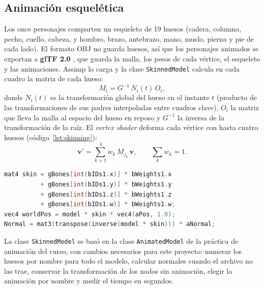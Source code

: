 \documentclass[12pt,letterpaper]{article}
\begin{document}
\subsection{Animación esquelética}
\label{sec:esqueleto}
Los once personajes comparten un esqueleto de 19 huesos (cadera, columna, pecho, cuello,
cabeza, y hombro, brazo, antebrazo, mano, muslo, pierna y pie de cada lado). El formato OBJ
no guarda huesos, así que los personajes animados se exportan a \textbf{glTF 2.0}
\cite{gltf2021}, que guarda la malla, los pesos de cada vértice, el esqueleto y las
animaciones. Assimp \cite{assimp} lo carga y la clase \texttt{SkinnedModel} calcula en cada
cuadro la matriz de cada hueso:
\begin{equation}
  M_i = G^{-1}\, N_i(t)\, O_i,
\end{equation}
donde $N_i(t)$ es la transformación global del hueso en el instante $t$ (producto de las
transformaciones de sus padres interpoladas entre cuadros clave), $O_i$ la matriz que lleva
la malla al espacio del hueso en reposo y $G^{-1}$ la inversa de la transformación de la
raíz. El \emph{vertex shader} deforma cada vértice con hasta cuatro huesos
(código~\ref{lst:skinning}):
\begin{equation}
  \mathbf{v}' = \sum_{k=1}^{4} w_k\, M_{j_k}\, \mathbf{v}, \qquad \sum_k w_k = 1.
\end{equation}

\begin{lstlisting}[language=C, caption={Deformación de vértices con los huesos (\texttt{shaders/phong\_skinning.vs}).}, label={lst:skinning}]
mat4 skin = gBones[int(bIDs1.x)] * bWeights1.x
          + gBones[int(bIDs1.y)] * bWeights1.y
          + gBones[int(bIDs1.z)] * bWeights1.z
          + gBones[int(bIDs1.w)] * bWeights1.w;
vec4 worldPos = model * skin * vec4(aPos, 1.0);
Normal = mat3(transpose(inverse(model * skin))) * aNormal;
\end{lstlisting}

La clase \texttt{SkinnedModel} se basó en la clase \texttt{AnimatedModel} de la práctica de
animación del curso, con cambios necesarios para este proyecto: numerar los huesos por
nombre para todo el modelo, calcular normales cuando el archivo no las trae, conservar la
transformación de los nodos sin animación, elegir la animación por nombre y medir el tiempo
en segundos.
\end{document}
